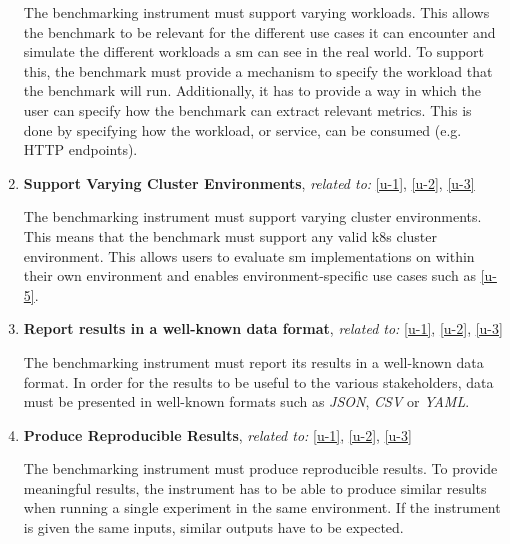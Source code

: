 \begin{enumerate}[label=\textbf{FR\arabic*}, leftmargin=3\parindent]
    The benchmarking instrument must support varying workloads. This allows the benchmark to be relevant for the different use cases it can encounter and simulate the different workloads a \gls{sm} can see in the real world. To support this, the benchmark must provide a mechanism to specify the workload that the benchmark will run. Additionally, it has to provide a way in which the user can specify how the benchmark can extract relevant metrics. This is done by specifying how the workload, or service, can be consumed (e.g. HTTP endpoints).
    
    \item \textbf{Support Varying Cluster Environments}, \textit{related to:} \ref{u-1}, \ref{u-2}, \ref{u-3} 
    \label{system:fr-5}
    
    The benchmarking instrument must support varying cluster environments. This means that the benchmark must support any valid \gls{k8s} cluster environment. This allows users to evaluate \gls{sm} implementations on within their own environment and enables environment-specific use cases such as \ref{u-5}.
    
    \item \textbf{Report results in a well-known data format}, \textit{related to:} \ref{u-1}, \ref{u-2}, \ref{u-3} 
    \label{system:fr-6}
    
    The benchmarking instrument must report its results in a well-known data format. In order for the results to be useful to the various stakeholders, data must be presented in well-known formats such as \textit{JSON}, \textit{CSV} or \textit{YAML}.
    
    
    \item \textbf{Produce Reproducible Results}, \textit{related to:} \ref{u-1}, \ref{u-2}, \ref{u-3} 
    \label{system:fr-7}
    
    The benchmarking instrument must produce reproducible results. To provide meaningful results, the instrument has to be able to produce similar results when running a single experiment in the same environment. If the instrument is given the same inputs, similar outputs have to be expected.
    
\end{enumerate}

